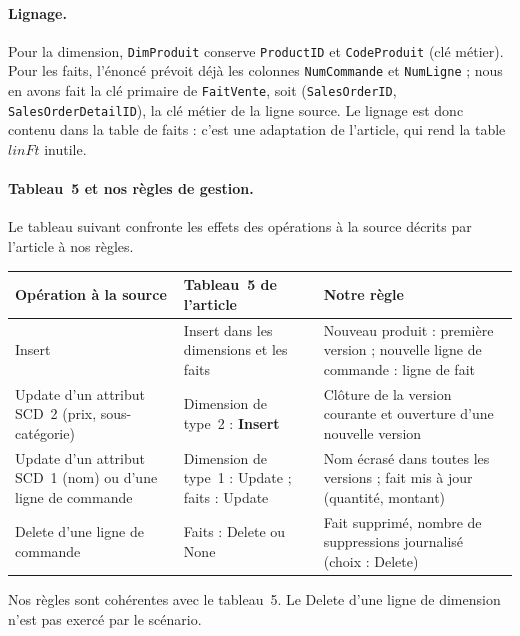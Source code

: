 \documentclass[9pt,a4paper]{article}
\begin{document}
\paragraph{Lignage.} Pour la dimension, \texttt{DimProduit} conserve \texttt{ProductID} et \texttt{CodeProduit} (clé métier). Pour les faits, l'énoncé prévoit déjà les colonnes \texttt{NumCommande} et \texttt{NumLigne} ; nous en avons fait la clé primaire de \texttt{FaitVente}, soit (\texttt{SalesOrderID}, \texttt{SalesOrderDetailID}), la clé métier de la ligne source. Le lignage est donc contenu dans la table de faits : c'est une adaptation de l'article, qui rend la table $linFt$ inutile.

\paragraph{Tableau~5 et nos règles de gestion.} Le tableau suivant confronte les effets des opérations à la source décrits par l'article à nos règles.

\smallskip
\begingroup\small
\begin{tabularx}{\textwidth}{@{}>{\raggedright\arraybackslash}p{3.6cm}>{\raggedright\arraybackslash}p{4.6cm}X@{}}
\toprule
Opération à la source & Tableau~5 de l'article & Notre règle \\
\midrule
Insert & Insert dans les dimensions et les faits & Nouveau produit : première version ; nouvelle ligne de commande : ligne de fait \\
Update d'un attribut SCD~2 (prix, sous-catégorie) & Dimension de type~2 : \textbf{Insert} & Clôture de la version courante et ouverture d'une nouvelle version \\
Update d'un attribut SCD~1 (nom) ou d'une ligne de commande & Dimension de type~1 : Update ; faits : Update & Nom écrasé dans toutes les versions ; fait mis à jour (quantité, montant) \\
Delete d'une ligne de commande & Faits : Delete ou None & Fait supprimé, nombre de suppressions journalisé (choix : Delete) \\
\bottomrule
\end{tabularx}
\endgroup

Nos règles sont cohérentes avec le tableau~5. Le Delete d'une ligne de dimension n'est pas exercé par le scénario.
\end{document}
